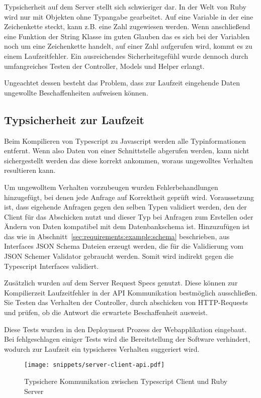 Typsicherheit auf dem Server stellt sich schwieriger dar. In der Welt von Ruby wird nur mit Objekten ohne Typangabe gearbeitet.
Auf eine Variable in der eine Zeichenkette steckt, kann z.B. eine Zahl zugewiesen werden. Wenn anschließend eine Funktion der String Klasse
im guten Glauben das es sich bei der Variablen noch um eine Zeichenkette handelt, auf einer Zahl aufgerufen wird, kommt es zu einem Laufzeitfehler.
Ein ausreichendes Sicherheitsgefühl wurde dennoch durch umfangreiches Testen der Controller, Models und Helper erlangt.

Ungeachtet dessen besteht das Problem, dass zur Laufzeit eingehende Daten ungewollte Beschaffenheiten aufweisen können.

\subsection{Typsicherheit zur Laufzeit}
\label{sec:requirements:pros:typesafe-runtime}
Beim Kompilieren von Typescript zu Javascript werden alle Typinformationen entfernt.
Wenn also Daten von einer Schnittstelle abgerufen werden, kann nicht sichergestellt werden das diese korrekt ankommen, woraus
ungewolltes Verhalten resultieren kann.

Um ungewolltem Verhalten vorzubeugen wurden Fehlerbehandlungen hinzugefügt, bei denen jede Anfrage auf Korrektheit geprüft wird.
Voraussetzung ist, dass eigehende Anfragen gegen den selben Typen validiert werden,
den der Client für das Abschicken nutzt und dieser Typ bei Anfragen zum Erstellen oder Ändern von Daten kompatibel mit dem Datenbankschema ist.
Hinzuzufügen ist das wie in Abschnitt~\ref{sec:requirements:example:schema} beschrieben, aus Interfaces JSON Schema Dateien erzeugt werden,
die für die Validierung vom JSON Schemer Validator gebraucht werden. Somit wird indirekt gegen die Typescript Interfaces validiert.

Zusätzlich wurden auf dem Server Request Specs genutzt.
Diese können zur Kompilierzeit Laufzeitfehler in der API Kommunikation bestmöglich ausschließen.
Sie Testen das Verhalten der Controller, durch abschicken von HTTP-Requests und prüfen, ob die Antwort die erwartete Beschaffenheit ausweist. 

Diese Tests wurden in den Deployment Prozess der Webapplikation eingebaut. Bei fehlgeschlagen einiger Tests wird die Bereitstellung der Software
verhindert, wodurch zur Laufzeit ein typsicheres Verhalten suggeriert wird.

\begin{figure}[h!]
    \centering
    \texttt{[image: snippets/server-client-api.pdf]}
    \caption{Typsichere Kommunikation zwischen Typescript Client und Ruby Server}
    \label{req:typesafe:server-client-short}
\end{figure}

